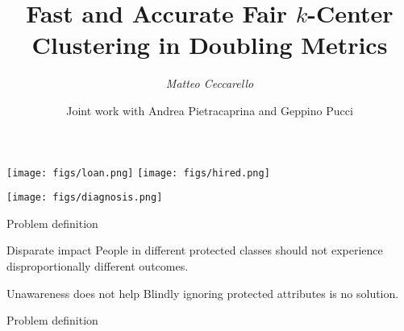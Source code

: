 \documentclass{beamer}
\title{Fast and Accurate Fair $k$-Center Clustering in Doubling Metrics}
\author{\emph{Matteo Ceccarello}}
\institute{U. of Padova}
\date{Joint work with Andrea Pietracaprina and Geppino Pucci}
\begin{document}
\frame{\titlepage}

%


\begin{frame}{}
	\centering

  \texttt{[image: figs/loan.png]}
  \texttt{[image: figs/hired.png]}

  \texttt{[image: figs/diagnosis.png]}

\end{frame}

\begin{frame}{Problem definition}
	\begin{block}{Disparate impact}
    People in different protected
		classes should not experience disproportionally different outcomes.
	\end{block}

	\pause

	\begin{block}{Unawareness does not help}
		Blindly ignoring protected attributes
		is no solution.
	\end{block}
\end{frame}

\begin{frame}{Problem definition}
	\centering


\end{frame}
\end{document}
